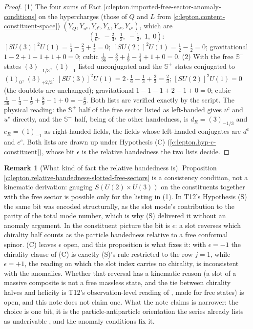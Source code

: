 \documentclass[11pt]{article}
\theoremstyle{definition}
\newtheorem{remark}[theorem]{Remark}
\theoremstyle{plain}
\providecommand{\CS}{}\renewcommand{\CS}{{\mathbb{S}^{+}}}
\providecommand{\CSm}{}\renewcommand{\CSm}{{\mathbb{S}^{-}}}
\begin{document}
\begin{proof}
(1) The four sums of Fact \ref{c:lepton.imported-free-sector-anomaly-conditions} on the hypercharges (those of $Q$ and $L$ from \ref{c:lepton.content-constituent-space}) $(Y_{Q}, Y_{u^{c}}, Y_{d^{c}}, Y_{L}, Y_{e^{c}}, Y_{\nu^{c}})$, which are
\[
(\tfrac16,\; -\tfrac23,\; \tfrac13,\; -\tfrac12,\; 1,\; 0):
\] $[SU(3)]^{2}U(1) = \tfrac13 - \tfrac23 + \tfrac13 = 0$; $[SU(2)]^{2}U(1) = \tfrac12 - \tfrac12 = 0$; gravitational $1 - 2 + 1 - 1 + 1 + 0 = 0$; cubic $\tfrac{1}{36} - \tfrac89 + \tfrac19 - \tfrac14 + 1 + 0 = 0$. (2) With the free $\CSm{}$ states $(3)_{-1/3}$, $(1)_{-1}$ listed unconjugated and the $\CS$ states conjugated to $(1)_{0}$, $(3)_{+2/3}$: $[SU(3)]^{2}U(1) = 2 \cdot \tfrac16 - \tfrac13 + \tfrac23 = \tfrac23$; $[SU(2)]^{2}U(1) = 0$ (the doublets are unchanged); gravitational $1 - 1 - 1 + 2 - 1 + 0 = 0$; cubic $\tfrac{1}{36} - \tfrac14 - \tfrac19 + \tfrac89 - 1 + 0 = -\tfrac49$. Both lists are verified exactly by the script. The physical reading: the $\CS$ half of the free sector listed as left-handed gives $\nu^{c}$ and $u^{c}$ directly, and the $\CSm{}$ half, being of the other handedness, is $d_{R} = (3)_{-1/3}$ and $e_{R} = (1)_{-1}$ as right-handed fields, the fields whose left-handed conjugates are $d^{c}$ and $e^{c}$. Both lists are drawn up under Hypothesis (C) (\ref{c:lepton.hyp-c-constituent}), whose bit $\epsilon$ is the relative handedness the two lists decide.

\end{proof}

\begin{remark}[What kind of fact the relative handedness is]\label{c:note.lepton.what-kind-fact-relative-handedness}
Proposition \ref{c:lepton.relative-handedness-slotted-free-sectors} is a consistency condition, not a kinematic derivation: gauging $S(U(2) \times U(3))$ on the constituents together with the free sector is possible only for the listing in (1). In T12's Hypothesis (S) the same bit was encoded structurally, as the slot mode's contribution to the parity of the total mode number, which is why (S) delivered it without an anomaly argument. In the constituent picture the bit is $\epsilon$: a slot reverses which chirality half counts as the particle handedness relative to a free conformal spinor. (C) leaves $\epsilon$ open, and this proposition is what fixes it: with $\epsilon = -1$ the chirality clause of (C) is exactly (S)'s rule restricted to the row $j = 1$, while $\epsilon = +1$, the reading on which the slot index carries no chirality, is inconsistent with the anomalies. Whether that reversal has a kinematic reason (a slot of a massive composite is not a free massless state, and the tie between chirality halves and helicity is T12's observation-level reading of \cite[Fact~2.3]{ButlerT12}, made for free states) is open, and this note does not claim one. What the note claims is narrower: the choice is one bit, it is the particle-antiparticle orientation the series already lists as underivable \cite[Prop.~5.2]{ButlerT14}, and the anomaly conditions fix it.
\end{remark}
\end{document}
